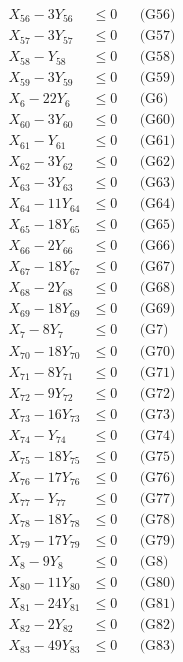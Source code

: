 \documentclass[a4paper,10pt]{article}
\begin{document}
{\begin{align}
X_{56} - 3Y_{56} &\leq 0 && \text{(G56)} \\
X_{57} - 3Y_{57} &\leq 0 && \text{(G57)} \\
X_{58} - Y_{58} &\leq 0 && \text{(G58)} \\
X_{59} - 3Y_{59} &\leq 0 && \text{(G59)} \\
X_{6} - 22Y_{6} &\leq 0 && \text{(G6)} \\
X_{60} - 3Y_{60} &\leq 0 && \text{(G60)} \\
X_{61} - Y_{61} &\leq 0 && \text{(G61)} \\
X_{62} - 3Y_{62} &\leq 0 && \text{(G62)} \\
X_{63} - 3Y_{63} &\leq 0 && \text{(G63)} \\
X_{64} - 11Y_{64} &\leq 0 && \text{(G64)} \\
X_{65} - 18Y_{65} &\leq 0 && \text{(G65)} \\
X_{66} - 2Y_{66} &\leq 0 && \text{(G66)} \\
\allowbreak
X_{67} - 18Y_{67} &\leq 0 && \text{(G67)} \\
X_{68} - 2Y_{68} &\leq 0 && \text{(G68)} \\
X_{69} - 18Y_{69} &\leq 0 && \text{(G69)} \\
X_{7} - 8Y_{7} &\leq 0 && \text{(G7)} \\
X_{70} - 18Y_{70} &\leq 0 && \text{(G70)} \\
X_{71} - 8Y_{71} &\leq 0 && \text{(G71)} \\
X_{72} - 9Y_{72} &\leq 0 && \text{(G72)} \\
X_{73} - 16Y_{73} &\leq 0 && \text{(G73)} \\
X_{74} - Y_{74} &\leq 0 && \text{(G74)} \\
X_{75} - 18Y_{75} &\leq 0 && \text{(G75)} \\
X_{76} - 17Y_{76} &\leq 0 && \text{(G76)} \\
X_{77} - Y_{77} &\leq 0 && \text{(G77)} \\
X_{78} - 18Y_{78} &\leq 0 && \text{(G78)} \\
X_{79} - 17Y_{79} &\leq 0 && \text{(G79)} \\
X_{8} - 9Y_{8} &\leq 0 && \text{(G8)} \\
X_{80} - 11Y_{80} &\leq 0 && \text{(G80)} \\
X_{81} - 24Y_{81} &\leq 0 && \text{(G81)} \\
X_{82} - 2Y_{82} &\leq 0 && \text{(G82)} \\
X_{83} - 49Y_{83} &\leq 0 && \text{(G83)} \\

\end{align}}
\end{document}
